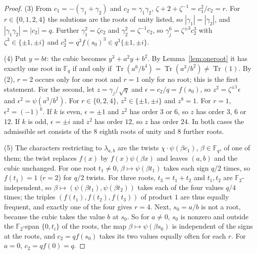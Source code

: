 \documentclass[11pt,a4paper]{amsart}
\theoremstyle{definition}
\theoremstyle{remark}
\newcommand{\F}{\mathbb{F}}
\newcommand{\Tr}{\operatorname{Tr}}
\begin{document}
\begin{proof}
(3) From $c_1=-(\gamma_1+\gamma_2)$ and $c_2=\gamma_1\gamma_2$, $\zeta+2+\zeta^{-1}=c_1^2/c_2=r$. For
$r\in\{0,1,2,4\}$ the solutions are the roots of unity listed, so $|\gamma_1|=|\gamma_2|$, and
$|\gamma_1\gamma_2|=|c_2|=q$. Further $\gamma_1^2=\zeta c_2$ and $\gamma_2^2=\zeta^{-1}c_2$, so
$\gamma_j^6=\zeta^{\pm3}c_2^3$ with $\zeta^3\in\{\pm1,\pm i\}$ and $c_2^3=q^3f(s_0)^3\in q^3\{\pm1,\pm i\}$.

(4) Put $y=bt$: the cubic becomes $y^3+a^2y+b^2$. By Lemma~\ref{lem:oneroot} it has exactly one root in $\F_q$ if
and only if $\Tr(a^6/b^4)=\Tr(a^3/b^2)\ne\Tr(1)$. By (2), $r=2$ occurs only for one root and $r=1$ only for no root;
this is the first statement. For the second, let $z=\gamma_j/\sqrt q$ and $\epsilon=c_2/q=f(s_0)$, so
$z^2=\zeta^{\pm1}\epsilon$ and $\epsilon^2=\psi(a^3/b^2)$. For $r\in\{0,2,4\}$, $z^2\in\{\pm1,\pm i\}$ and
$z^8=1$. For $r=1$, $\epsilon^2=(-1)^k$. If $k$ is even, $\epsilon=\pm1$ and $z^2$ has order $3$ or $6$, so $z$ has
order $3$, $6$ or $12$. If $k$ is odd, $\epsilon=\pm i$ and $z^2$ has order $12$, so $z$ has order $24$. In both
cases the admissible set consists of the $8$ eighth roots of unity and $8$ further roots.

(5) The characters restricting to $\lambda_{a,b}$ are the twists $\chi\cdot\psi(\beta e_1)$, $\beta\in\F_q$, of one of
them; the twist replaces $f(x)$ by $f(x)\psi(\beta x)$ and leaves $(a,b)$ and the cubic unchanged. For one root
$t_1\ne0$, $\beta\mapsto\psi(\beta t_1)$ takes each sign $q/2$ times, so $f(t_1)=1$ ($r=2$) for $q/2$ twists. For
three roots, $t_3=t_1+t_2$ and $t_1,t_2$ are $\F_2$-independent, so $\beta\mapsto(\psi(\beta t_1),\psi(\beta t_2))$
takes each of the four values $q/4$ times; the triples $(f(t_1),f(t_2),f(t_3))$ of product $1$ are thus equally
frequent, and exactly one of the four gives $r=4$. Next, $s_0=a/b$ is not a root, because the cubic takes the value
$b$ at $s_0$. So for $a\ne0$, $s_0$ is nonzero and outside the $\F_2$-span $\{0,t_i\}$ of the roots, the map
$\beta\mapsto\psi(\beta s_0)$ is independent of the signs at the roots, and $c_2=qf(s_0)$ takes its two values
equally often for each $r$. For $a=0$, $c_2=qf(0)=q$.


\end{proof}
\end{document}
